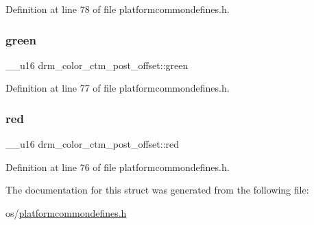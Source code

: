Definition at line 78 of file platformcommondefines.\+h.

\mbox{\label{structdrm__color__ctm__post__offset_a1deb06f90eac8e9e1f21e6d2728af1b4}} 
\subsubsection{\texorpdfstring{green}{green}}
{\footnotesize\ttfamily \+\_\+\+\_\+u16 drm\+\_\+color\+\_\+ctm\+\_\+post\+\_\+offset\+::green}



Definition at line 77 of file platformcommondefines.\+h.

\mbox{\label{structdrm__color__ctm__post__offset_a5b7b2feda04ca2d62ba2c569d2458dc3}} 
\subsubsection{\texorpdfstring{red}{red}}
{\footnotesize\ttfamily \+\_\+\+\_\+u16 drm\+\_\+color\+\_\+ctm\+\_\+post\+\_\+offset\+::red}



Definition at line 76 of file platformcommondefines.\+h.



The documentation for this struct was generated from the following file\+:\begin{DoxyCompactItemize}
\item 
os/\mbox{\hyperlink{platformcommondefines_8h}{platformcommondefines.\+h}}\end{DoxyCompactItemize}
